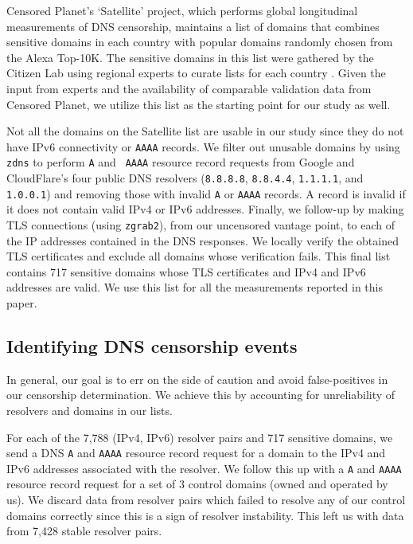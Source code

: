  Censored Planet's `Satellite' project,
which performs global longitudinal measurements of DNS censorship,
\cite{sundara2020censored} maintains a list of domains that combines sensitive
domains in each country with popular domains randomly chosen from the Alexa
Top-10K. The sensitive domains in this list were gathered by the Citizen Lab
using regional experts to curate lists for each country
\cite{citizenlab-blocklists}. Given the input from experts and the availability
of comparable validation data from Censored Planet, we
utilize this list as the starting point for our study as well.  

 Not all the domains on the Satellite list
are usable in our study since they do not have IPv6 connectivity or {\tt AAAA}
records.
%
We filter out unusable domains by using {\tt zdns} to perform {\tt A} and {\tt
AAAA} resource record requests from Google and CloudFlare's four public DNS
resolvers ({\tt 8.8.8.8}, {\tt 8.8.4.4}, {\tt 1.1.1.1}, and {\tt 1.0.0.1}) and
removing those with invalid {\tt A} or {\tt AAAA} records. A record is invalid
if it does not contain valid IPv4 or IPv6 addresses.
%
Finally, we follow-up by making TLS connections (using {\tt zgrab2}), from our
uncensored vantage point, to each of the IP addresses contained in the DNS
responses. We locally verify the obtained TLS certificates and exclude all
domains whose verification fails. 
%
This final list contains 717 sensitive domains whose TLS certificates and IPv4
and IPv6 addresses are valid. We use this list for all the measurements
reported in this paper.

\subsection{Identifying DNS censorship events} \label{sec:methodology:censorship}
In general, our goal is to err on the side of caution and avoid false-positives
in our censorship determination. We achieve this by accounting for
unreliability of resolvers and domains in our lists.

For each of the 7,788 (IPv4, IPv6) resolver pairs and 717 sensitive domains, we
send a DNS {\tt A} and {\tt AAAA} resource record request for a domain to the
IPv4 and IPv6 addresses associated with the resolver. We follow this up with
a {\tt A} and {\tt AAAA} resource record request for a set of 3 control domains
(owned and operated by us).
%
We discard data from resolver pairs which failed to resolve any of our control
domains correctly since this is a sign of resolver instability. This left us
with data from 7,428 stable resolver pairs.
%

